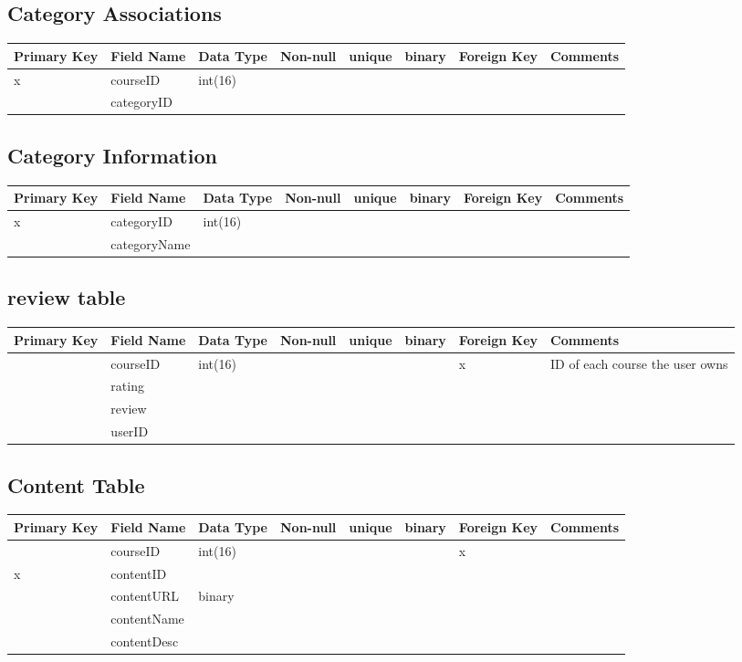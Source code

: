 \documentclass{article}
\begin{document}
\subsection{Category Associations}
\begin{tabular}{|m{1cm} | m{2cm} | m{1.5cm}| m{1cm} | m{1cm}| m{1cm} | m{1cm}| m{4cm}| }
  \hline
  Primary Key & Field Name & Data Type & Non-null & unique & binary & Foreign Key & Comments\\ 
  \hline
  x & courseID & int(16) & & & & &\\
  \hline
   & categoryID & & & & & &\\
  \hline
\end{tabular}

\subsection{Category Information}
\begin{tabular}{|m{1cm} | m{2cm} | m{1.5cm}| m{1cm} | m{1cm}| m{1cm} | m{1cm}| m{4cm}| }
  \hline
  Primary Key & Field Name & Data Type & Non-null & unique & binary & Foreign Key & Comments\\ 
  \hline
  x & categoryID & int(16) & & & & &\\
  \hline
   & categoryName & & & & & &\\
  \hline
\end{tabular}

\subsection{review table}
\begin{tabular}{|m{1cm} | m{2cm} | m{1.5cm}| m{1cm} | m{1cm}| m{1cm} | m{1cm}| m{4cm}| }
  \hline
  Primary Key & Field Name & Data Type & Non-null & unique & binary & Foreign Key & Comments\\ 
  \hline
   & courseID & int(16) & & & & x & ID of each course the user owns\\
  \hline
   & rating & & & & & &\\
  \hline
   & review & & & & & &\\
  \hline
   & userID & & & & & &\\
  \hline
\end{tabular}

\subsection{Content Table}
\begin{tabular}{|m{1cm} | m{2cm} | m{1.5cm}| m{1cm} | m{1cm}| m{1cm} | m{1cm}| m{4cm}| }
  \hline
  Primary Key & Field Name & Data Type & Non-null & unique & binary & Foreign Key & Comments\\ 
  \hline
   & courseID & int(16) & & & & x &\\
  \hline
  x & contentID & & & & & &\\
  \hline
   & contentURL & binary & & & & &\\
  \hline
   & contentName & & & & & &\\
  \hline
   & contentDesc & & & & & &\\
  \hline
\end{tabular}
\end{document}
